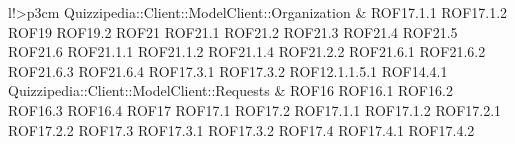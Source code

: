 \begin{tabella}{l!{\VRule}>{\centering\arraybackslash}p{3cm}}
Quizzipedia::Client::ModelClient::Organization & ROF17.1.1 \linebreak ROF17.1.2 \linebreak ROF19 \linebreak ROF19.2 \linebreak ROF21 \linebreak ROF21.1 \linebreak ROF21.2 \linebreak ROF21.3 \linebreak ROF21.4 \linebreak ROF21.5 \linebreak ROF21.6 \linebreak ROF21.1.1 \linebreak ROF21.1.2 \linebreak ROF21.1.4 \linebreak ROF21.2.2 \linebreak ROF21.6.1 \linebreak ROF21.6.2 \linebreak ROF21.6.3 \linebreak ROF21.6.4 \linebreak ROF17.3.1 \linebreak ROF17.3.2 \linebreak ROF12.1.1.5.1 \linebreak ROF14.4.1 \\
Quizzipedia::Client::ModelClient::Requests & ROF16 \linebreak ROF16.1 \linebreak ROF16.2 \linebreak ROF16.3 \linebreak ROF16.4 \linebreak ROF17 \linebreak ROF17.1 \linebreak ROF17.2 \linebreak ROF17.1.1 \linebreak ROF17.1.2 \linebreak ROF17.2.1 \linebreak ROF17.2.2 \linebreak ROF17.3 \linebreak ROF17.3.1 \linebreak ROF17.3.2 \linebreak ROF17.4 \linebreak ROF17.4.1 \linebreak ROF17.4.2 \\

\end{tabella}
